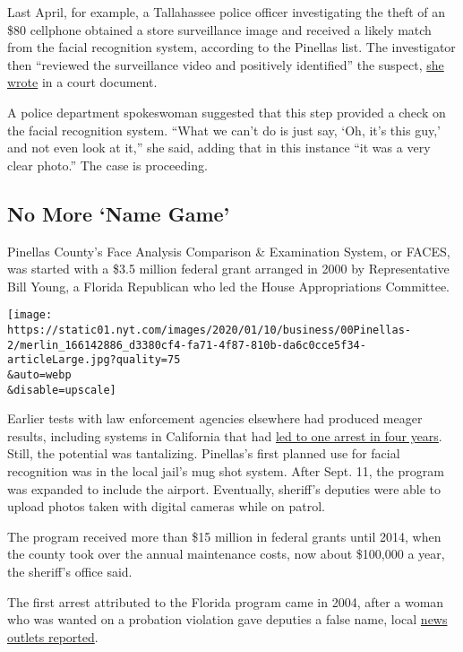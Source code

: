 Last April, for example, a Tallahassee police officer investigating the
theft of an \$80 cellphone obtained a store surveillance image and
received a likely match from the facial recognition system, according to
the Pinellas list. The investigator then ``reviewed the surveillance
video and positively identified'' the suspect,
\href{https://www.documentcloud.org/documents/6586364-Targettheft-Redacted.html}{she
wrote} in a court document.

A police department spokeswoman suggested that this step provided a
check on the facial recognition system. ``What we can't do is just say,
`Oh, it's this guy,' and not even look at it,'' she said, adding that in
this instance ``it was a very clear photo.'' The case is proceeding.

\hypertarget{no-more-name-game}{%
\subsection{No More `Name Game'}\label{no-more-name-game}}

Pinellas County's Face Analysis Comparison \& Examination System, or
FACES, was started with a \$3.5 million federal grant arranged in 2000
by Representative Bill Young, a Florida Republican who led the House
Appropriations Committee.

\texttt{[image: https://static01.nyt.com/images/2020/01/10/business/00Pinellas-2/merlin\_166142886\_d3380cf4-fa71-4f87-810b-da6c0cce5f34-articleLarge.jpg?quality=75\\\&auto=webp\\\&disable=upscale]}

Earlier tests with law enforcement agencies elsewhere had produced
meager results, including systems in California that had
\href{https://www.nytimes.com/2001/05/03/technology/those-dimples-may-be-digits.html}{led
to one arrest in four years}. Still, the potential was tantalizing.
Pinellas's first planned use for facial recognition was in the local
jail's mug shot system. After Sept. 11, the program was expanded to
include the airport. Eventually, sheriff's deputies were able to upload
photos taken with digital cameras while on patrol.

The program received more than \$15 million in federal grants until
2014, when the county took over the annual maintenance costs, now about
\$100,000 a year, the sheriff's office said.

The first arrest attributed to the Florida program came in 2004, after a
woman who was wanted on a probation violation gave deputies a false
name, local
\href{https://www.orlandosentinel.com/news/os-xpm-2004-09-15-0409150165-story.html}{news
outlets reported}.

